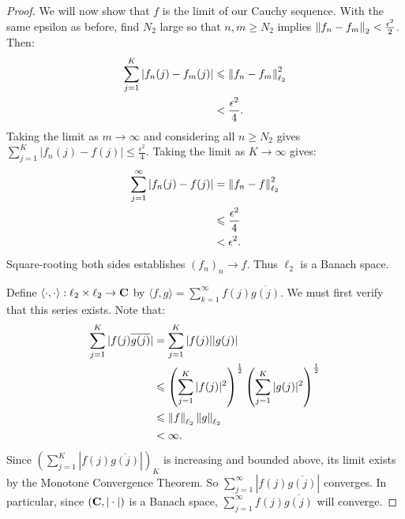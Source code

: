 \documentclass[11pt,twoside,openany]{memoir}
\begin{document}
\begin{proof}
            We will now show that $f$ is the limit of our Cauchy sequence. With the same epsilon as before, find $N_2$ large so that $n,m \geq N_2$ implies $\left\lVert f_n - f_m \right\rVert_2 < \frac{\epsilon^2}{2}$. Then:
                \begin{equation*}
                \begin{split}
                    \sum_{j = 1}^K | f_n(j) - f_m(j)|
                    & \leqslant \left\lVert f_n - f_m \right\rVert_{\ell_2}^2 \\
                    & < \frac{\epsilon^2}{4}.
                \end{split}
                \end{equation*}
            Taking the limit as $m \rightarrow \infty$ and considering all $n \geq N_2$ gives $\sum_{j = 1}^K |f_n(j) - f(j)| \leq \frac{\epsilon^2}{4}$. Taking the limit as $K \rightarrow \infty$ gives:
                \begin{equation*}
                \begin{split}
                    \sum_{j = 1}^\infty |f_n(j) - f(j)|
                    & = \left\lVert f_n - f \right\rVert_{\ell_2}^2 \\
                    & \leqslant \frac{\epsilon^2}{4} \\
                    & < \epsilon^2.
                \end{split}
                \end{equation*}
            Square-rooting both sides establishes $(f_n)_n \rightarrow f$. Thus $\ell_2$ is a Banach space.

            Define $\langle \cdot,\cdot \rangle: \ell_2 \times \ell_2 \rightarrow \mathbf{C}$ by $\langle f,g \rangle = \sum_{k = 1}^\infty f(j)\overline{g(j)}$. We must first verify that this series exists. Note that:
                \begin{equation*}
                \begin{split}
                    \sum_{j = 1}^K |f(j) \overline{g(j)}| 
                    & = \sum_{j = 1}^K |f(j)||g(j)| \\
                    & \leqslant \left( \sum_{j = 1}^K |f(j)|^2 \right)^\frac{1}{2}\left( \sum_{j = 1}^K |g(j)|^2 \right)^\frac{1}{2} \\
                    & \leqslant \left\lVert f \right\rVert_{\ell_2} \left\lVert g \right\rVert_{\ell_2} \\
                    & < \infty.
                \end{split}
                \end{equation*}
            Since $\left( \sum_{j = 1}^K |f(j) \overline{g(j)}| \right)_K$ is increasing and bounded above, its limit exists by the Monotone Convergence Theorem. So $\sum_{j = 1}^\infty |f(j) \overline{g(j)}|$ converges. In particular, since $(\mathbf{C}, |\cdot|)$ is a Banach space, $\sum_{j = 1}^\infty f(j) \overline{g(j)}$ will converge.


\end{proof}
\end{document}
